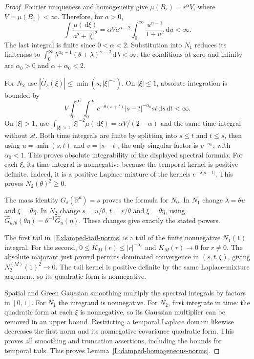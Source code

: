 \documentclass[12pt]{article}
\numberwithin{equation}{section}
\theoremstyle{definition}
\newcommand{\R}{\mathbb{R}}
\newcommand{\ud}{\,\mathrm{d}}
\begin{document}
\begin{proof}
  Fourier uniqueness and homogeneity give
  $\mu(B_r)=r^\alpha V$, where $V=\mu(B_1)<\infty$.
  Therefore, for $a>0$,
  \[
    \int\frac{\mu(\ud\xi)}{a^2+|\xi|^2}
    =\alpha V a^{\alpha-2}
    \int_0^\infty\frac{u^{\alpha-1}}{1+u^2}\ud u<\infty.
  \]
  The last integral is finite since $0<\alpha<2$.
  Substitution into $N_1$ reduces its finiteness to
  $\int_0^\infty\lambda^{\alpha_0-1}(\theta+\lambda)^{\alpha-2}
  \ud\lambda<\infty$: the conditions at zero and infinity are
  $\alpha_0>0$ and $\alpha+\alpha_0<2$.

  For $N_2$ use
  $|\widehat G_s(\xi)|\le\min(s,|\xi|^{-1})$.
  On $|\xi|\le1$, absolute integration is bounded by
  \[
    V\int_0^\infty\int_0^\infty
    e^{-\theta(s+t)}|s-t|^{-\alpha_0}st\ud s\ud t<\infty.
  \]
  On $|\xi|>1$, use
  $\int_{|\xi|>1}|\xi|^{-2}\mu(\ud\xi)=\alpha V/(2-\alpha)$
  and the same time integral without $st$. Both time integrals are
  finite by splitting into $s\le t$ and $t\le s$, then using
  $u=\min(s,t)$ and $v=|s-t|$; the only singular factor is
  $v^{-\alpha_0}$, with $\alpha_0<1$.
  This proves absolute integrability of the displayed spectral formula.
  For each $\xi$, its time integral is nonnegative because the
  temporal kernel is positive definite. Indeed, it is a positive
  Laplace mixture of the kernels $e^{-\lambda|s-t|}$.
  This proves $N_2(\theta)^2\ge0$.

  The mass identity $G_s(\R^d)=s$ proves the formula for $N_0$.
  In $N_1$ change $\lambda=\theta u$ and $\xi=\theta\eta$.
  In $N_2$ change $s=u/\theta$, $t=v/\theta$ and
  $\xi=\theta\eta$, using
  $\widehat G_{u/\theta}(\theta\eta)=\theta^{-1}\widehat G_u(\eta)$.
  These changes give exactly the stated powers.

  The first tail in~\eqref{E:damped-tail-norms} is a tail of the
  finite nonnegative $N_1(1)$ integral. For the second,
  $0\le K_M(r)\le|r|^{-\alpha_0}$ and $K_M(r)\to0$ for $r\ne0$.
  The absolute majorant just proved permits dominated convergence
  in $(s,t,\xi)$, giving $N_2^{(M)}(1)^2\to0$.
  The tail kernel is positive definite by the same Laplace-mixture
  argument, so its quadratic form is nonnegative.

  Spatial and Green Gaussian smoothing multiply the spectral integrals
  by factors in $[0,1]$. For $N_1$ the integrand is nonnegative.
  For $N_2$, first integrate in time: the quadratic form at each
  $\xi$ is nonnegative, so its Gaussian multiplier can be removed
  in an upper bound. Restricting a temporal Laplace domain likewise
  decreases the first norm and its nonnegative covariance quadratic
  form. This proves all smoothing and truncation assertions, including
  the bounds for temporal tails.
  This proves Lemma~\ref{L:damped-homogeneous-norms}.
\end{proof}
\end{document}
